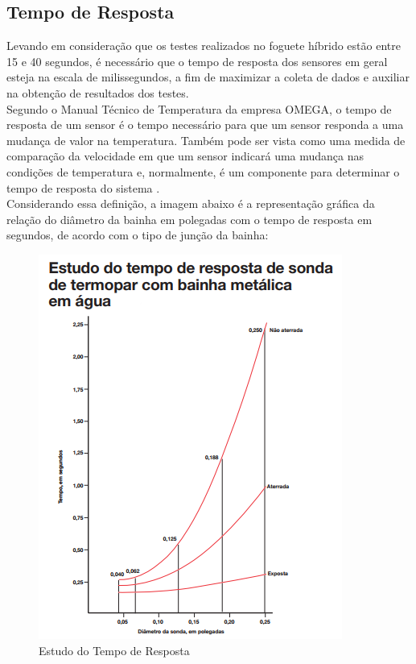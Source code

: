 \subsection{Tempo de Resposta}
Levando em consideração que os testes realizados no foguete híbrido estão entre 15 e 40 segundos, é necessário que o tempo de resposta dos sensores em geral esteja na escala de milissegundos, a fim de maximizar a coleta de dados e auxiliar na obtenção de resultados dos testes.\\
Segundo o Manual Técnico de Temperatura da empresa OMEGA, o tempo de resposta de um sensor é o tempo necessário para que um sensor responda a uma mudança de valor na temperatura. Também pode ser vista como uma medida de comparação da velocidade em que um sensor indicará uma mudança nas condições de temperatura e, normalmente, é um componente para determinar o tempo de resposta do sistema .\\
Considerando essa definição, a imagem abaixo é a representação gráfica da relação do diâmetro da bainha em polegadas com o tempo de resposta em segundos, de acordo com o tipo de junção da bainha:
\begin{figure}[!htb]                   
	\centering                          
	\includegraphics[scale=1]{figuras/Figura3.png}
	\caption{Estudo do Tempo de Resposta}               
\end{figure}	
